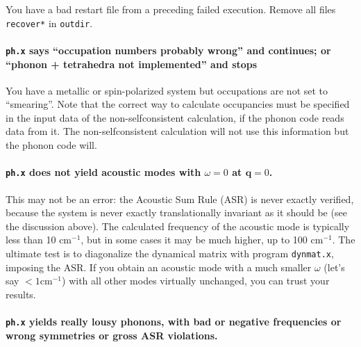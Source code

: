 \documentclass[12pt,a4paper]{article}
\begin{document}
You have a bad restart file from a preceding failed execution.
Remove all files \texttt{recover*} in \texttt{outdir}.

\paragraph{\texttt{ph.x} says ``occupation numbers probably wrong''
and continues; or ``phonon + tetrahedra not implemented'' and stops}

You have a metallic or spin-polarized system but occupations are not 
set to ``smearing''. Note that the correct way to calculate occupancies 
must be specified in the input data of the non-selfconsistent 
calculation, if the phonon code reads data from it. The non-selfconsistent 
calculation will not use this information but the phonon code will.

\paragraph{\texttt{ph.x} does not yield acoustic modes with $\omega=0$
           at $\mathbf{q}=0$.}

This may not be an error: the Acoustic Sum Rule (ASR) is never exactly
verified, because the system is never exactly translationally
invariant as it should be (see the discussion above).
The calculated frequency of the acoustic mode is typically less than
10 cm$^{-1}$, but in some cases it may be much higher, up to 100
cm$^{-1}$.
The ultimate test is to diagonalize the dynamical matrix with program
\texttt{dynmat.x}, imposing the ASR.
If you obtain an acoustic mode with a much smaller $\omega$ (let's say
$<1 \textrm{cm}^{-1}$) with all other modes virtually unchanged, you
can trust your results.

\paragraph{\texttt{ph.x} yields really lousy phonons, with bad or
           negative frequencies or wrong symmetries or gross ASR
           violations.}
\end{document}
